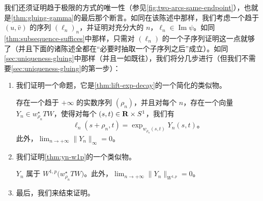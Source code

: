我们还须证明趋于极限的方式的唯一性（参见\cref{fig:two-arcs-same-endpoint}），也就是\cref{thm:gluing-gamma}的最后那个断言。如同在该陈述中那样，我们考虑一个趋于 $(u,\widehat{v})$ 的序列 $(\ell_{n})_{n}$，并证明对充分大的 $n$，$\ell_{n}\in\operatorname{Im}\psi$。如同\cref{thm:subsequence-suffices}中那样，只需对 $(\ell_{n})$ 的一个子序列证明这一点就够了（并且下面的诸陈述全都在“必要时抽取一个子序列之后”成立）。如同\cref{sec:uniqueness-gluing}中那样（并且一如既往），我们将分几步进行（但我们不需要\cref{sec:uniqueness-gluing}的第一步）：
\begin{enumerate}[label=(\arabic*)]
\item 我们证明一个命题，它是\cref{thm:lift-exp-decay}的一个简化的类似物。

\begin{proposition}\label{thm:exists-rho-n-yn}
存在一个趋于 $+\infty$ 的实数序列 $(\rho_{n})$，并且对每个 $n$，存在一个向量 $Y_{n}\in w_{\rho_{n}}^{\star}TW$，使得对每个 $(s,t)\in\mathbf{R}\times S^{1}$，我们有
\[
\ell_{n}(s+\rho_{n},t)=\exp_{w_{\rho_{n}}(s,t)}Y_{n}(s,t)\text{。}
\]
此外，$\lim_{n\to+\infty}\bigl\|Y_{n}\bigr\|_{\infty}=0$。
\end{proposition}

\item 我们证明\cref{thm:yn-w1p}的一个类似物。

\begin{proposition}\label{thm:yn-w1p-null}
\trVectorField{} $Y_{n}$ 属于 $W^{1,p}\bigl(w_{\rho_{n}}^{\star}TW\bigr)$。此外，$\lim_{n\to+\infty}\bigl\|Y_{n}\bigr\|_{W^{1,p}}=0$。
\end{proposition}

\item 最后，我们来结束证明。
\end{enumerate}

